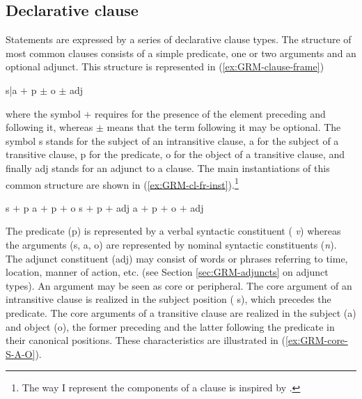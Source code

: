 \subsection{Declarative clause}
\label{sec:GRM-decl-clause}

Statements are expressed by a series of declarative clause types. The structure
of most common clauses consists of  a simple predicate, one or two arguments and
an optional adjunct. This structure is represented in
(\ref{ex:GRM-clause-frame})


\ea\label{ex:GRM-clause-frame}
 {\sc s|a}  $+$ {\sc p} $\pm$ {\sc o} $\pm$ {\sc adj} 
\z

where the symbol $+$  requires for the presence of the element preceding
and following it,  whereas  $\pm$ means that the term following it may be
optional.
The
symbol {\sc s} stands for the subject of an intransitive clause,  {\sc a} 
for the subject of a transitive clause, {\sc p}  for the predicate,  {\sc
o}  for the object of a transitive clause, and finally {\sc adj}
stands for an adjunct to a clause. The main instantiations  of this common
structure are shown in  (\ref{ex:GRM-cl-fr-inst}).\footnote{The way I represent
the components of a clause is inspired by \citet[31]{Bonv88}.}


\ea\label{ex:GRM-cl-fr-inst}

\ea\label{ex:GRM-cl-fr-inst-s-p}
 {\sc s}  $+$ {\sc p} 
\ex\label{ex:GRM-cl-fr-inst-s-p-o}
 {\sc a}  $+$ {\sc p} $+$ {\sc o}
\ex\label{ex:GRM-cl-fr-inst-s-p-adj}
 {\sc s}  $+$ {\sc p}  $+$ {\sc adj} 
 \ex\label{ex:GRM-cl-fr-inst-s-p-o-adj}
 {\sc a}  $+$ {\sc p} $+$ {\sc o} $+$ {\sc adj} 

\z
\z


The predicate ({\sc p})  is represented by a verbal syntactic constituent ({\it
v}) whereas  the arguments ({\sc s, a, o}) are represented by nominal syntactic
constituents   ({\it n}).  The adjunct constituent  ({\sc adj}) may consist of 
words or phrases referring to time, location, manner of action, etc.  (see
Section \ref{sec:GRM-adjuncts} on adjunct types).  An
argument may be seen as core or peripheral.  The core
argument of an intransitive clause is realized in the subject position ({\sc
s}), which
precedes the predicate. The core arguments of a transitive clause are realized
in the subject ({\sc a}) and object ({\sc o}), the former preceding and the
latter following the predicate in their canonical positions. These
characteristics are illustrated in 
(\ref{ex:GRM-core-S-A-O}).




